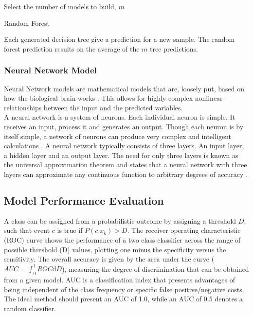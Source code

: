 \begin{algorithm}[H]
 Select the number of models to build, $m$\\
 \caption{Random Forest}
\label{alg:alg_rf}
\end{algorithm}
\vspace{5mm}

Each generated decision tree give a prediction for a new sample. The random forest prediction results on the average of the $m$ tree predictions.  
    	
    	\subsubsection{Neural Network Model}
    	\noindent Neural Network models are mathematical models that are, loosely put, based on how the biological brain works \citep{baesens2003using}. This allows for highly complex nonlinear relationships between the input and the predicted variables. \\
    	 [\baselineskip]\indent A neural network is a system of neurons. Each individual neuron is simple. It receives an input, process it and generates an output. Though each neuron is by itself simple, a network of neurons can produce very complex and intelligent calculations \citep{shiffman2012nature}. A neural network typically consists of three layers. An input layer, a hidden layer and an output layer. The need for only three layers is known as the universal approximation theorem and states that a neural network with three layers can approximate any continuous function to arbitrary degrees of accuracy \citep{hornik1989multilayer}.\\
    \subsection{Model Performance Evaluation}
    \noindent A class can be assigned from a probabilistic outcome by assigning a threshold $D$, such that event $c$ is true if $P\left(c| x_k\right)>D$. The receiver operating characteristic (ROC) curve shows the performance of a two class classifier across the range of possible threshold (D) values, plotting one minus the specificity versus the sensitivity\citep{tom2006an}. The overall accuracy is given by the area under the curve ($AUC = \int_0^1ROC \mathrm{d}D$), measuring the degree of discrimination that can be obtained from a given model. AUC is a classification index\citep{david2011performance} that presents advantages of being independent of the class frequency or specific false positive/negative costs. The ideal method should present an AUC of 1.0, while an AUC of 0.5 denotes a random classifier.
    
